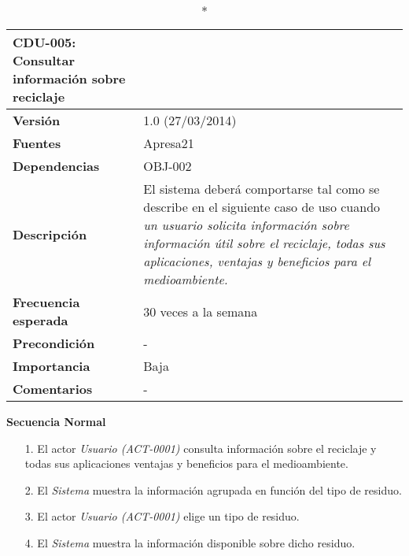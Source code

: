 \begin{longtable}{p{2.5cm}  p{14cm}}
\caption*{\textbf{CDU-005: Consultar información sobre reciclaje}} \\
\hline
\textbf{Versión} & 1.0 (27/03/2014) \\
\textbf{Fuentes} & Apresa21 \\
\textbf{Dependencias} & OBJ-002 \\
\textbf{Descripción} & El sistema deberá comportarse tal como se describe en el siguiente caso de uso cuando \textit{un usuario solicita información sobre información útil sobre el reciclaje, todas sus aplicaciones, ventajas y beneficios para el medioambiente.} \\
\textbf{Frecuencia esperada} & 30 veces a la semana  \\
\textbf{Precondición} & - \\
\textbf{Importancia} & Baja  \\
\textbf{Comentarios} &- \\
\end{longtable}

\textbf{Secuencia Normal} 
\begin{enumerate}
	\item[1.] El actor \textit{Usuario (ACT-0001)} consulta información sobre el reciclaje y todas sus aplicaciones ventajas y beneficios para el medioambiente.
	\item[2.] El \textit{Sistema} muestra la información agrupada en función del tipo de residuo.
	\item[3.] El actor \textit{Usuario (ACT-0001)} elige un tipo de residuo.
	\item[4.] El \textit{Sistema} muestra la información disponible sobre dicho residuo.
\end{enumerate}